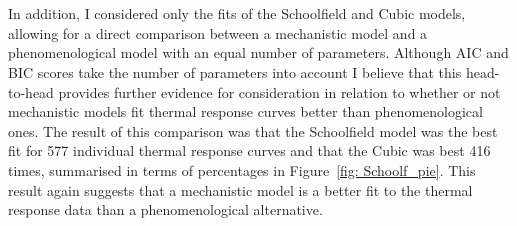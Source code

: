 \documentclass[11pt]{article}
\begin{document}
\\
\\
In addition, I considered only the fits of the Schoolfield and Cubic models, allowing for a direct comparison between a mechanistic model and a phenomenological model with an equal number of parameters. Although AIC and BIC scores take the number of parameters into account I believe that this head-to-head provides further evidence for consideration in relation to whether or not mechanistic models fit thermal response curves better than phenomenological ones. The result of this comparison was that the Schoolfield model was the best fit for 577 individual thermal response curves and that the Cubic was best 416 times, summarised in terms of percentages in Figure~\ref{fig: Schoolf_pie}. This result again suggests that a mechanistic model is a better fit to the thermal response data than a phenomenological alternative.
\end{document}

